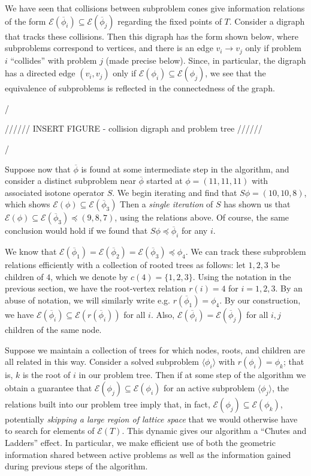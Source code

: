 \documentclass[11pt,reqno]{amsart}
\theoremstyle{definition}
\numberwithin{equation}{section}
\newcommand{\ol}{\overline}
\newcommand{\lag}{\langle}
\newcommand{\rag}{\rangle}
\newcommand{\pre}{\phi}
\newcommand{\sub}{\subseteq}
\newcommand{\fix}{\mathcal{E}}
\newcommand{\peq}{\preceq}
\newcommand{\toppre}{\ol{\pre}}
\begin{document}
We have seen that collisions between subproblem cones give information relations of the form $\fix(\toppre_i) \sub \fix(\toppre_j)$ regarding the fixed points of $T$.
Consider a digraph that tracks these collisions.
Then this digraph has the form shown below, where subproblems correspond to vertices, and there is an edge $v_i \to v_j$ only if problem $i$ ``collides'' with problem $j$ (made precise below). 
Since, in particular, the digraph has a directed edge $(v_i,v_j)$ only if $\fix(\pre_i) \sub \fix(\pre_j)$, we see that the equivalence of subproblems is reflected in the connectedness of the graph. 

/

////// INSERT FIGURE - collision digraph and problem tree //////

/


Suppose now that $\toppre$ is found at some intermediate step in the algorithm, and consider a distinct subproblem near $\toppre$ started at $\pre = (11,11,11)$ with associated isotone operator $S$.
We begin iterating and find that $S \pre = (10,10,8)$, which shows $\fix(\pre) \sub \fix(\toppre_3)$ 
Then a \emph{single iteration} of $S$ has shown us that $\fix(\pre) \sub \fix(\toppre_3) \peq (9,8,7)$, using the relations above. 
Of course, the same conclusion would hold if we found that  $S \pre \peq \toppre_i$ for any $i$. 

We know that $\fix(\toppre_1) = \fix(\toppre_2) = \fix(\toppre_3) \peq \pre_4$. 
We can track these subproblem relations efficiently with a collection of rooted trees as follows: let $1,2,3$ be children of $4$, which we denote by $c(4) = \{1,2,3\}$.
Using the notation in the previous section, we have the root-vertex relation $r(i) = 4$ for $i = 1,2,3$. 
By an abuse of notation, we will similarly write e.g. $r(\toppre_1) = \pre_4$. 
By our construction, we have $\fix(\toppre_i) \sub \fix(r(\toppre_i))$ for all $i$. 
Also, $\fix(\toppre_i) = \fix(\toppre_j)$ for all $i,j$ children of the same node. 

Suppose we maintain a collection of trees for which nodes, roots, and children are all related in this way. 
Consider a solved subproblem $\lag \pre_i \rag$ with $r(\pre_i) = \pre_k$; that is, $k$ is the root of $i$ in our problem tree.
Then if at some step of the algorithm we obtain a guarantee that $\fix(\pre_j) \sub \fix(\pre_i)$ for an active subproblem $\lag \pre_j \rag$, the relations built into our problem tree imply that, in fact, $\fix(\pre_j) \sub \fix(\pre_k)$, potentially \emph{skipping a large region of lattice space} that we would otherwise have to search for elements of $\fix(T)$. 
This dynamic gives our algorithm a ``Chutes and Ladders'' effect. 
In particular, we make efficient use of both the geometric information shared between active problems as well as the information gained during previous steps of the algorithm. 
\end{document}
